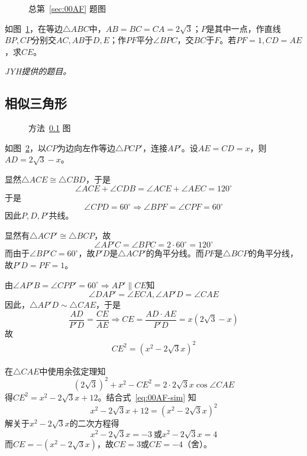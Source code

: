 

\begin{figure}[htbp]
  \centering {}
  \caption{总第~\ref{sec:00AF} 题图} \label{fig:00AF}
\end{figure}

如图~\ref{fig:00AF}，在等边$\triangle ABC$中，$AB = BC = CA = 2\sqrt3$；$P$是其中一点，作直线$BP, CP$分别交$AC, AB$于$D, E$；作$PF$平分$\angle BPC$，交$BC$于$F$。若$PF = 1, CD = AE$，求$CE$。

\emph{JYH提供的题目。}


\subsection{相似三角形} \label{subsec:00AF-sim}

\begin{figure}[htbp]
  \centering {}
  \caption{方法~\ref{subsec:00AF-sim} 图} \label{fig:00AF-sim}
\end{figure}

如图~\ref{fig:00AF-sim}，以$CP$为边向左作等边$\triangle PCP'$，连接$AP'$。设$AE = CD = x$，则$AD = 2\sqrt3 - x$。

显然$\triangle ACE \cong \triangle CBD$，于是
\[ \angle ACE + \angle CDB = \angle ACE + \angle AEC = 120^\circ \]
于是
\[ \angle CPD = 60^\circ \Rightarrow \angle BPF = \angle CPF = 60^\circ \]
因此$P, D, P'$共线。

显然有$\triangle ACP' \cong \triangle BCP$，故
\[ \angle AP'C = \angle BPC = 2\cdot60^\circ = 120^\circ \]
而由于$\angle BP'C = 60^\circ$，故$P'D$是$\triangle ACP'$的角平分线。而$PF$是$\triangle BCP$的角平分线，故$P'D = PF = 1$。

由$\angle AP'B = \angle CPP' = 60^\circ \Rightarrow AP' \parallel CE$知
\[ \angle DAP' = \angle ECA, \angle AP'D = \angle CAE \]
因此，$\triangle AP'D \sim \triangle CAE$，于是
\[ \frac{AD}{P'D} = \frac{CE}{AE} \Rightarrow CE = \frac{AD\cdot AE}{P'D} = x\left(2\sqrt3 - x\right) \]
故
\begin{align}
  CE^2 = \left(x^2 - 2\sqrt3x\right)^2 \label{eq:00AF-sim}
\end{align}

在$\triangle CAE$中使用余弦定理知
\[ \left(2\sqrt3\right)^2 + x^2 - CE^2 = 2\cdot2\sqrt3x\cos\angle CAE \]
得$CE^2 = x^2 - 2\sqrt3x + 12$。结合式~\ref{eq:00AF-sim} 知
\[ x^2 - 2\sqrt3x + 12 = \left(x^2 - 2\sqrt3x\right)^2 \]
解关于$x^2 - 2\sqrt3x$的二次方程得
\[ x^2 - 2\sqrt3x = -3\ \text{或} x^2 - 2\sqrt3x = 4 \]
而$CE = -\left(x^2 - 2\sqrt3x\right)$，故$CE = 3$或$CE = -4$（舍）。

